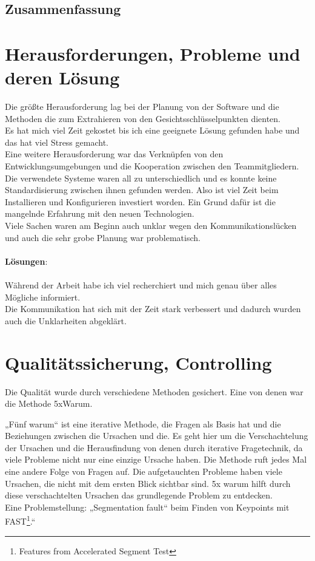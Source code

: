 \subsection{Zusammenfassung}






\section{Herausforderungen, Probleme und deren Lösung }

Die größte Herausforderung lag bei der Planung von der Software und die Methoden die zum Extrahieren von den Gesichtsschlüsselpunkten dienten.\\
 Es hat mich viel Zeit gekostet bis ich eine geeignete Lösung gefunden habe und das hat viel Stress gemacht. \\
Eine weitere Herausforderung war das Verknüpfen von den Entwicklungsumgebungen  und die Kooperation zwischen den Teammitgliedern. \\
Die verwendete Systeme waren all zu unterschiedlich und es konnte keine Standardisierung zwischen ihnen gefunden werden. Also ist viel Zeit beim Installieren und Konfigurieren investiert worden. Ein Grund dafür ist die mangelnde Erfahrung mit den neuen Technologien. \\
Viele Sachen waren am Beginn auch unklar wegen den Kommunikationslücken und auch die sehr grobe Planung war problematisch. \\\\



\textbf{Lösungen}: \\\\
Während der Arbeit habe ich viel recherchiert und mich genau über alles Mögliche informiert. \\
Die Kommunikation hat sich mit der Zeit stark verbessert und dadurch wurden auch die Unklarheiten abgeklärt. \\

\section{Qualitätssicherung, Controlling}
Die Qualität wurde durch verschiedene Methoden gesichert. Eine von denen war die Methode 5xWarum. 

„Fünf warum“ ist eine iterative Methode, die Fragen als Basis hat und die Beziehungen zwischen die Ursachen und die. Es geht hier um die Verschachtelung der Ursachen und die Herausfindung von denen durch iterative Fragetechnik, da viele Probleme nicht nur eine einzige Ursache haben. Die Methode ruft jedes Mal eine andere Folge von Fragen auf.
\cite{fmea}
Die aufgetauchten Probleme haben viele Ursachen, die nicht mit dem ersten Blick sichtbar sind. 5x warum hilft durch diese verschachtelten Ursachen das grundlegende Problem zu entdecken. \\
Eine Problemstellung: „Segmentation fault“ beim Finden von Keypoints mit FAST\footnote{Features from Accelerated Segment Test}.“ 

